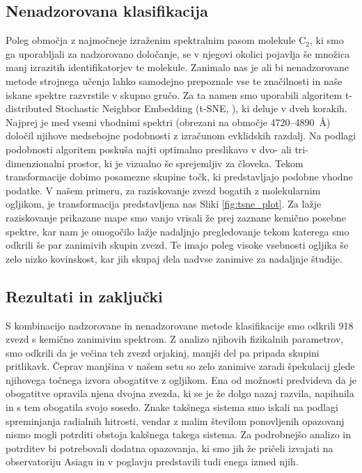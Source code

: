 \subsection{Nenadzorovana klasifikacija}
Poleg območja z najmočneje izraženim spektralnim pasom molekule C$_{2}$, ki smo ga uporabljali za nadzorovano določanje, se v njegovi okolici pojavlja še množica manj izrazitih identifikatorjev te molekule. Zanimalo nas je ali bi nenadzorovane metode strojnega učenja lahko samodejno prepoznale vse te značilnosti in naše iskane spektre razvrstile v skupno gručo. Za ta namen smo uporabili algoritem t-distributed Stochastic Neighbor Embedding (t-SNE, \cite{van2008visualizing}), ki deluje v dveh korakih. Najprej je med vsemi vhodnimi spektri (obrezani na območje 4720--4890~\AA) določil njihove medsebojne podobnosti z izračunom evklidskih razdalj. Na podlagi podobnosti algoritem poskuša najti optimalno preslikavo v dvo- ali tri-dimenzionalni prostor, ki je vizualno še sprejemljiv za človeka. Tekom transformacije dobimo posamezne skupine točk, ki predstavljajo podobne vhodne podatke. V našem primeru, za raziskovanje zvezd bogatih z molekularnim ogljikom, je transformacija predstavljena nas Sliki \ref{fig:tsne_plot}. Za lažje raziskovanje prikazane mape smo vanjo vrisali že prej zaznane kemično posebne spektre, kar nam je omogočilo lažje nadaljnjo pregledovanje tekom katerega smo odkrili še par zanimivih skupin zvezd. Te imajo poleg visoke vsebnosti ogljika še zelo nizko kovinskost, kar jih skupaj dela nadvse zanimive za nadaljnje študije.

\subsection{Rezultati in zaključki}
S kombinacijo nadzorovane in nenadzorovane metode klasifikacije smo odkrili 918 zvezd s kemično zanimivim spektrom. Z analizo njihovih fizikalnih parametrov, smo odkrili da je večina teh zvezd orjakinj, manjši del pa pripada skupini pritlikavk. Čeprav manjšina v našem setu so zelo zanimive zaradi špekulacij glede njihovega točnega izvora obogatitve z ogljikom. Ena od možnosti predvideva da je obogatitve opravila njena dvojna zvezda, ki se je že dolgo nazaj razvila, napihnila in s tem obogatila svojo sosedo. Znake takšnega sistema smo iskali na podlagi spreminjanja radialnih hitrosti, vendar z malim številom ponovljenih opazovanj nismo mogli potrditi obstoja kakšnega takega sistema. Za podrobnejšo analizo in potrditev bi potrebovali dodatna opazovanja, ki smo jih že pričeli izvajati na observatoriju Asiagu in v poglavju predstavili tudi enega izmed njih.

